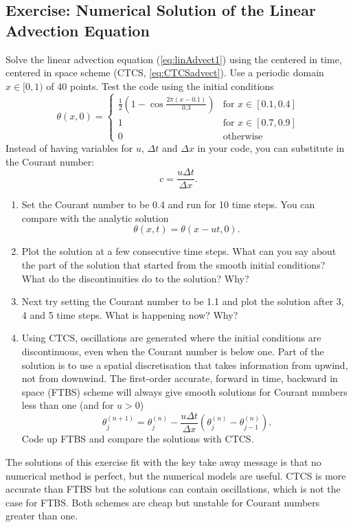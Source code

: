 \subsection{Exercise: Numerical Solution of the Linear Advection Equation}\label{subsec:Ex_CTCSadvection}

Solve the linear advection equation (\ref{eq:linAdvect1}) using the
centered in time, centered in space scheme (CTCS, \ref{eq:CTCSadvect}).
Use a periodic domain $x\in[0,1)$ of 40 points. Test the code using
the initial conditions
\begin{equation}
\theta\left(x,0\right)=\begin{cases}
\frac{1}{2}\left(1-\cos\frac{2\pi\left(x-0.1\right)}{0.3}\right) & \text{for }x\in\left[0.1,0.4\right]\\
1 & \text{for }x\in\left[0.7,0.9\right]\\
0 & \text{otherwise}
\end{cases}
\end{equation}
Instead of having variables for $u$, $\Delta t$ and $\Delta x$
in your code, you can substitute in the Courant number:
\begin{equation}
c=\frac{u\Delta t}{\Delta x}.\label{eq:Courant}
\end{equation}

\begin{enumerate}
\item Set the Courant number to be 0.4 and run for 10 time steps. You can
compare with the analytic solution
\begin{equation}
\theta\left(x,t\right)=\theta\left(x-ut,0\right).
\end{equation}
\item Plot the solution at a few consecutive time steps. What can you say
about the part of the solution that started from the smooth initial
conditions? What do the discontinuities do to the solution? Why?
\item Next try setting the Courant number to be 1.1 and plot the solution
after 3, 4 and 5 time steps. What is happening now? Why?
\item Using CTCS, oscillations are generated where the initial conditions
are discontinuous, even when the Courant number is below one. Part
of the solution is to use a spatial discretisation that takes information
from upwind, not from downwind. The first-order accurate, forward
in time, backward in space (FTBS) scheme will always give smooth solutions
for Courant numbers less than one (and for $u>0$)
\begin{equation}
\theta_{j}^{(n+1)}=\theta_{j}^{(n)}-\frac{u\Delta t}{\Delta x}\left(\theta_{j}^{(n)}-\theta_{j-1}^{(n)}\right).
\end{equation}
Code up FTBS and compare the solutions with CTCS.
\end{enumerate}
The solutions of this exercise fit with the key take away message
is that no numerical method is perfect, but the numerical models are
useful. CTCS is more accurate than FTBS but the solutions can contain
oscillations, which is not the case for FTBS. Both schemes are cheap
but unstable for Courant numbers greater than one.

